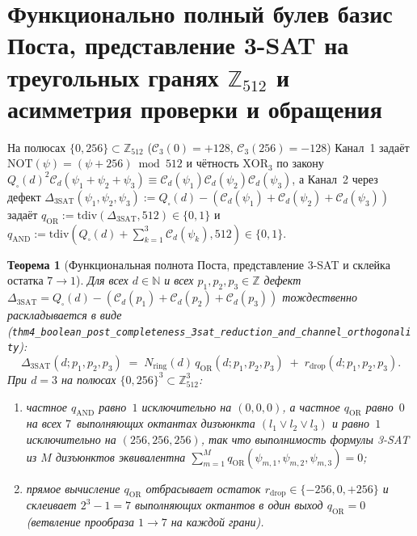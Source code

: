 \documentclass[11pt,a4paper]{article}
\theoremstyle{plain}
\newtheorem{theorem}{Теорема}[section]
\theoremstyle{definition}
\begin{document}
\section{Функционально полный булев базис Поста, представление 3-SAT на треугольных гранях \texorpdfstring{$\mathbb{Z}_{512}$}{Z512} и асимметрия проверки и обращения}
\label{sec:boolean-3sat}

На полюсах $\{0,256\}\subset\mathbb{Z}_{512}$ ($\mathcal{C}_3(0)=+128$, $\mathcal{C}_3(256)=-128$) Канал~1 задаёт $\mathrm{NOT}(\psi)=(\psi+256)\bmod 512$ и чётность $\mathrm{XOR}_3$ по закону $Q_\square(d)^2\mathcal{C}_d(\psi_1+\psi_2+\psi_3)\equiv \mathcal{C}_d(\psi_1)\mathcal{C}_d(\psi_2)\mathcal{C}_d(\psi_3)$, а Канал~2 через дефект $\Delta_{\mathrm{3SAT}}(\psi_1,\psi_2,\psi_3) := Q_\square(d)-(\mathcal{C}_d(\psi_1)+\mathcal{C}_d(\psi_2)+\mathcal{C}_d(\psi_3))$ задаёт $q_{\mathrm{OR}} := \mathrm{tdiv}(\Delta_{\mathrm{3SAT}},512)\in\{0,1\}$ и $q_{\mathrm{AND}} := \mathrm{tdiv}(Q_\square(d)+\sum_{k=1}^3\mathcal{C}_d(\psi_k),512)\in\{0,1\}$.

\begin{theorem}[Функциональная полнота Поста, представление 3-SAT и склейка остатка $7\to 1$]
\label{thm:main-4}
Для всех $d\in\mathbb{N}$ и всех $p_1,p_2,p_3\in\mathbb{Z}$ дефект $\Delta_{\mathrm{3SAT}} = Q_\square(d) - (\mathcal{C}_d(p_1)+\mathcal{C}_d(p_2)+\mathcal{C}_d(p_3))$ тождественно раскладывается в виде (\texttt{thm4\_boolean\_post\_completeness\_3sat\_reduction\_and\_channel\_orthogonality}):
\[
  \Delta_{\mathrm{3SAT}}(d;p_1,p_2,p_3) \;=\; N_{\mathrm{ring}}(d)\,q_{\mathrm{OR}}(d;p_1,p_2,p_3) \;+\; r_{\mathrm{drop}}(d;p_1,p_2,p_3).
\]
При $d=3$ на полюсах $\{0,256\}^3\subset\mathbb{Z}_{512}^3$:
\begin{enumerate}[label=\textbf{(\roman*)},leftmargin=*,noitemsep]
\item частное $q_{\mathrm{AND}}$ равно~$1$ исключительно на $(0,0,0)$, а частное $q_{\mathrm{OR}}$ равно~$0$ на всех $7$~выполняющих октантах дизъюнкта $(l_1\lor l_2\lor l_3)$ и равно~$1$ исключительно на $(256,256,256)$, так что выполнимость формулы 3-SAT из $M$ дизъюнктов эквивалентна $\sum_{m=1}^M q_{\mathrm{OR}}(\psi_{m,1},\psi_{m,2},\psi_{m,3}) = 0$;
\item прямое вычисление $q_{\mathrm{OR}}$ отбрасывает остаток $r_{\mathrm{drop}}\in\{-256,0,+256\}$ и склеивает $2^3-1=7$ выполняющих октантов в один выход $q_{\mathrm{OR}}=0$ (ветвление прообраза $1\to 7$ на каждой грани).
\end{enumerate}
\end{theorem}
\end{document}

